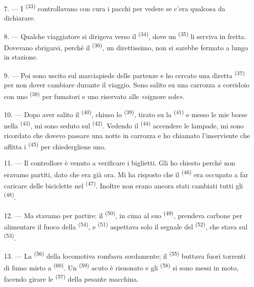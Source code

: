 7. --- I  \textsuperscript{(33)} controllavano con cura i pacchi per
vedere se c'era qualcosa da dichiarare.

8. --- Qualche viaggiatore si dirigeva verso il 
\textsuperscript{(34)}, dove un  \textsuperscript{(35)} li serviva in
fretta. Dovevano sbrigarsi, perché il  \textsuperscript{(36)}, un
direttissimo, non si sarebbe fermato a lungo in stazione.

9. --- Poi sono uscito sul marciapiede delle partenze e ho cercato una
 diretta \textsuperscript{(37)} per non dover cambiare durante il
viaggio. Sono salito su una carrozza a corridoio con uno 
\textsuperscript{(38)} per fumatori e uno riservato alle «signore sole».

\VUsaut{3.0mm}

10. --- Dopo aver salito il  \textsuperscript{(40)}, chiuso lo
 \textsuperscript{(39)}, tirato su la 
\textsuperscript{(41)} e messo le mie borse nella 
\textsuperscript{(43)}, mi sono seduto sul  \textsuperscript{(42)}.
Vedendo il  \textsuperscript{(44)} accendere le lampade, mi sono
ricordato che dovevo passare una notte in carrozza e ho chiamato l'inserviente che
affitta i  \textsuperscript{(45)} per chiedergliene uno.

11. --- Il controllore è venuto a verificare i biglietti. Gli ho chiesto perché non
eravamo partiti, dato che era già ora. Mi ha risposto che il 
\textsuperscript{(46)} era occupato a far caricare delle biciclette nel
 \textsuperscript{(47)}. Inoltre non erano ancora stati cambiati
tutti gli  \textsuperscript{(48)}.

12. --- Ma stavamo per partire: il  \textsuperscript{(50)}, in cima
al suo  \textsuperscript{(49)}, prendeva carbone per alimentare il fuoco
della  \textsuperscript{(54)}, e 
\textsuperscript{(51)} aspettava solo il segnale del 
\textsuperscript{(52)}, che stava sul  \textsuperscript{(53)}.

13. --- La  \textsuperscript{(56)} della locomotiva rombava sordamente;
il  \textsuperscript{(55)} buttava fuori torrenti di fumo misto a
 \textsuperscript{(60)}. Un  \textsuperscript{(59)}
acuto è risuonato e gli  \textsuperscript{(58)} si sono messi in
moto, facendo girare le  \textsuperscript{(57)} della pesante macchina.

